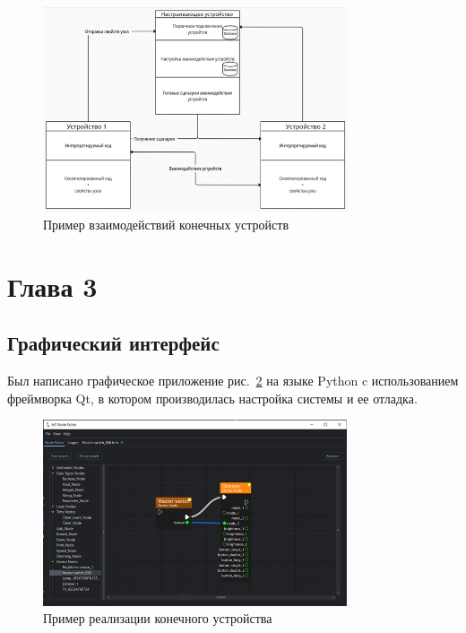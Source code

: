 \documentclass[a4paper,12pt]{article}
\begin{document}
\begin{figure}[h]
    \centering
    \includegraphics[width=0.8\textwidth]{images/Fig09.png}
    \caption{Пример взаимодействий конечных устройств}
    \label{fig:Observer_vs_pub_sub}
\end{figure}


\newpage

\section{Глава 3}

\subsection{Графический интерфейс}
Был написано графическое приложение рис.~\ref{fig:GUI_base} на языке Python c использованием фреймворка Qt, в котором производилась настройка системы и ее отладка.

\begin{figure}[h]
    \centering
    \includegraphics[width=0.8\textwidth]{images/Fig11.png}
    \caption{Пример реализации конечного устройства}
    \label{fig:GUI_base}
\end{figure}
\end{document}
